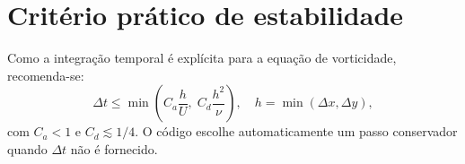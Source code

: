 \documentclass[12pt,a4paper]{article}
\begin{document}
\section*{Critério prático de estabilidade}

Como a integração temporal é explícita para a equação de vorticidade, recomenda-se:
\begin{equation}
\Delta t \leq \min\left( C_a\frac{h}{U},\; C_d\frac{h^2}{\nu}\right),
\quad h=\min(\Delta x,\Delta y),
\end{equation}
com $C_a<1$ e $C_d\lesssim 1/4$. O código escolhe automaticamente um passo conservador quando $\Delta t$ não é fornecido.
\end{document}
